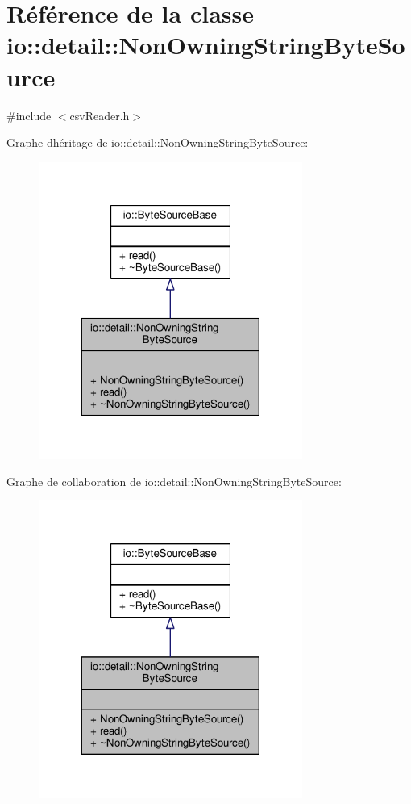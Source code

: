 \hypertarget{classio_1_1detail_1_1NonOwningStringByteSource}{}\section{Référence de la classe io\+:\+:detail\+:\+:Non\+Owning\+String\+Byte\+Source}
\label{classio_1_1detail_1_1NonOwningStringByteSource}


{\ttfamily \#include $<$csv\+Reader.\+h$>$}



Graphe d\textquotesingle{}héritage de io\+:\+:detail\+:\+:Non\+Owning\+String\+Byte\+Source\+:
\nopagebreak
\begin{figure}[H]
\begin{center}
\leavevmode
\includegraphics[width=245pt]{classio_1_1detail_1_1NonOwningStringByteSource__inherit__graph}
\end{center}
\end{figure}


Graphe de collaboration de io\+:\+:detail\+:\+:Non\+Owning\+String\+Byte\+Source\+:
\nopagebreak
\begin{figure}[H]
\begin{center}
\leavevmode
\includegraphics[width=245pt]{classio_1_1detail_1_1NonOwningStringByteSource__coll__graph}
\end{center}
\end{figure}
